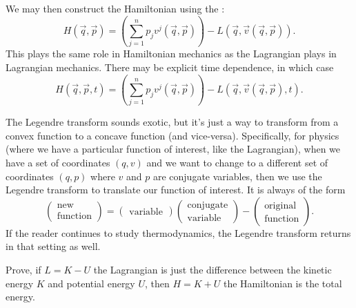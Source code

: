 We may then construct the Hamiltonian using the :
\begin{equation}\label{eq:hamiltonian-def}
H(\vec{q},\vec{p}) = \left(\sum^{n}_{j=1}p_{j}v^{j}(\vec{q},\vec{p})\right) - L(\vec{q},\vec{v}(\vec{q},\vec{p})).
\end{equation}
This plays the same role in Hamiltonian mechanics as the Lagrangian
plays in Lagrangian mechanics. There may be explicit time dependence, in
which case
\begin{equation}
H(\vec{q},\vec{p},t) = \left(\sum^{n}_{j=1}p_{j}v^{j}(\vec{q},\vec{p})\right) - L(\vec{q},\vec{v}(\vec{q},\vec{p}),t).
\end{equation}

\begin{remark}
The Legendre transform sounds exotic, but it's just a way to transform
from a convex function to a concave function (and
vice-versa). Specifically, for physics (where we have a particular
function of interest, like the Lagrangian), when we have a set of
coordinates $(q,v)$ and we want to change to a different set of
coordinates $(q,p)$ where $v$ and $p$ are conjugate variables, then we
use the Legendre transform to translate our function of interest. It is
always of the form
\begin{equation}
\begin{pmatrix}\mbox{new}\\
\mbox{function}
\end{pmatrix}
=\begin{pmatrix}
\mbox{variable}
\end{pmatrix}\begin{pmatrix}
\mbox{conjugate}\\
\mbox{variable}
\end{pmatrix}
-
\begin{pmatrix}
\mbox{original}\\
\mbox{function}
\end{pmatrix}.
\end{equation}
If the reader continues to study thermodynamics, the Legendre transform
returns in that setting as well.
\end{remark}

\begin{exercise}
Prove, if $L=K-U$ the Lagrangian is just the difference between the
kinetic energy $K$ and potential energy $U$, then $H=K+U$ the
Hamiltonian is the total energy.
\end{exercise}

